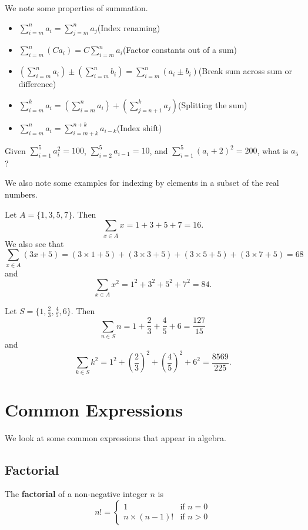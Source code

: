 \newpage

We note some properties of summation.
\begin{itemize}
    \item $\displaystyle \sum_{i=m}^na_i = \sum_{j=m}^na_j$\hfill(Index renaming)
    \item $\displaystyle \sum_{i=m}^n(Ca_i) = C\sum_{i=m}^na_i$\hfill(Factor constants out of a sum)
    \item $\displaystyle \left(\sum_{i=m}^na_i\right) \pm \left(\sum_{i=m}^nb_i\right) = \sum_{i=m}^n(a_i \pm b_i)$\hfill(Break sum across sum or difference)
    \item $\displaystyle \sum_{i=m}^ka_i = \left(\sum_{i=m}^na_i\right) + \left(\sum_{j={n+1}}^ka_j\right)$\hfill(Splitting the sum)
    \item $\displaystyle \sum_{i=m}^na_i = \sum_{i=m+k}^{n+k}a_{i-k}$\hfill(Index shift)
\end{itemize}

\begin{exercise}
    Given $\displaystyle \sum_{i=1}^5a_i^2 = 100$, $\displaystyle \sum_{i=2}^5a_{i-1} = 10$, and $\displaystyle \sum_{i=1}^5(a_i+2)^2 = 200$, what is $a_5$?
\end{exercise}

We also note some examples for indexing by elements in a subset of the real numbers.
\begin{example}
    Let $A = \{1, 3, 5, 7\}$. Then
    \[
        \sum_{x \in A} x = 1 + 3 + 5 + 7 = 16.
    \]
    We also see that
    \[
        \sum_{x \in A}(3x + 5) = (3\times1 + 5) + (3\times3 + 5) + (3\times5 + 5) + (3\times7 + 5) = 68
    \]
    and
    \[
        \sum_{x\in A}x^2 = 1^2 + 3^2 + 5^2 + 7^2 = 84.
    \]
\end{example}
\begin{example}
    Let $S = \{1, \frac23, \frac45, 6\}$. Then
    \[
        \sum_{n \in S}n = 1 + \frac23 + \frac45 + 6 = \frac{127}{15}
    \]
    and
    \[
        \sum_{k \in S}k^2 = 1^2 + \left(\frac23\right)^2 + \left(\frac45\right)^2 + 6^2 = \frac{8569}{225}.
    \]
\end{example}

\newpage

\section{Common Expressions}
We look at some common expressions that appear in algebra.

\subsection{Factorial}
\begin{definition}
    The \textbf{factorial} of a non-negative integer $n$ is
    \[
        n! = \begin{cases}
            1 & \text{if } n = 0\\
            n \times (n-1)! & \text{if } n > 0
        \end{cases}
    \]
\end{definition}

